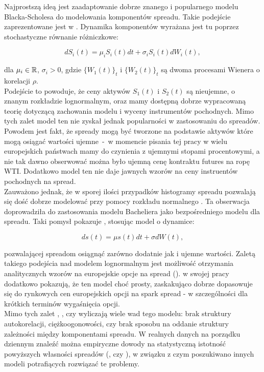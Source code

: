 Najprostszą ideą jest zaadaptowanie dobrze znanego i popularnego modelu Blacka-Scholesa \cite{Black_Scholes} do modelowania komponentów spreadu. Takie podejście zaprezentowane jest w \cite{Bjerksund_Spread_Options_Lognormal}. Dynamika komponentów wyrażana jest tu poprzez stochastyczne równanie różniczkowe:

$$ dS_i(t) = \mu_i S_i(t)dt + \sigma_i S_i(t)dW_i(t),$$

dla $\mu_i \in \mathbb{R}$, $\sigma_i >0$, gdzie $\{W_1(t)\}_t$ i $\{W_2(t)\}_t$ są dwoma procesami Wienera o korelacji $\rho$.\\

Podejście to powoduje, że ceny aktywów $S_1(t)$ i $S_2(t)$ są nieujemne, o znanym rozkładzie lognormalnym, oraz mamy dostępną dobrze wypracowaną teorię dotyczącą zachowania modelu i wyceny instrumentów pochodnych. Mimo tych zalet model ten nie zyskał jednak popularności w zastosowaniu do spreadów. Powodem jest fakt, że spready mogą być tworzone na podstawie aktywów które mogą osiągać wartości ujemne~-~w momencie pisania tej pracy w wielu europejskich państwach mamy do czynienia z ujemnymi stopami procentowymi, a nie tak dawno obserwować można było ujemną cenę kontraktu futures na ropę WTI. Dodatkowo model ten nie daje jawnych wzorów na ceny instruentów pochodnych na spread. \\
Zauważono jednak, że w sporej ilości przypadków histogramy spreadu pozwalają się dość dobrze modelować przy pomocy rozkładu normalnego \cite{Carmona_Spread_Options}. Ta obserwacja doprowadziła do zastosowania modelu Bacheliera jako bezpośredniego modelu dla spreadu. Taki pomysł pokazuje \cite{Poitras_Spread_Options_Arithmetic}, stosując model o dynamice:

$$ ds(t) = \mu s(t) dt + \sigma dW(t),$$

pozwalającej spreadom osiągnąć zarówno dodatnie jak i ujemne wartości. Zaletą takiego podejścia nad modelem lognormalnym jest możliwość otrzymania analitycznych wzorów na europejskie opcje na spread (\cite{Poitras_Spread_Options_Arithmetic}). \cite{Carmona_Spread_Options} w swojej pracy dodatkowo pokazują, że ten model choć prosty, zaskakująco dobrze  dopasowuje się do rynkowych cen europejskich opcji na spark spread - w szczególności dla krótkich terminów wygaśnięcia opcji.\\
Mimo tych zalet \cite{Herath_Copula_Crack_Spread}, \cite{Carmona_Spread_Options}, czy \cite{Kim_NonNormal_Spread} wyliczają wiele wad tego modelu: brak struktury autokorelacji, ciężkoogonowości, czy brak sposobu na oddanie struktury zależności między komponentami spreadu. W realnych danych na porządku dziennym znaleźć można empiryczne dowody na statystyczną istotność powyższych własności spreadów (\cite{Kim_NonNormal_Spread}, czy \cite{Schwartz_Ornstein}), w związku z czym poszukiwano innych modeli potrafiących rozwiązać te problemy.


